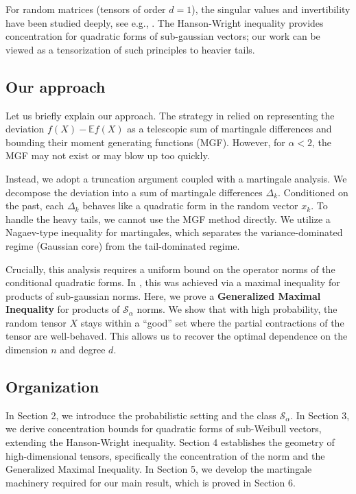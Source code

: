 \documentclass[11pt]{amsart}
\theoremstyle{definition}
\theoremstyle{remark}
\begin{document}
For random matrices (tensors of order $d=1$), the singular values and invertibility have been studied deeply, see e.g., \cite{Rudelson2008, Rudelson2012, RudelsonVershynin2008, RudelsonVershynin2009, TaoVu2009, TaoVu2010, Tikhomirov2015, Tikhomirov2016}. The Hanson-Wright inequality \cite{RudelsonVershynin2013} provides concentration for quadratic forms of sub-gaussian vectors; our work can be viewed as a tensorization of such principles to heavier tails.

\subsection{Our approach}
Let us briefly explain our approach. The strategy in \cite{Vershynin2020} relied on representing the deviation $f(X) - \mathbb{E}f(X)$ as a telescopic sum of martingale differences and bounding their moment generating functions (MGF). However, for $\alpha < 2$, the MGF may not exist or may blow up too quickly.

Instead, we adopt a truncation argument coupled with a martingale analysis. We decompose the deviation into a sum of martingale differences $\Delta_k$. Conditioned on the past, each $\Delta_k$ behaves like a quadratic form in the random vector $x_k$. To handle the heavy tails, we cannot use the MGF method directly. We utilize a Nagaev-type inequality for martingales, which separates the variance-dominated regime (Gaussian core) from the tail-dominated regime.

Crucially, this analysis requires a uniform bound on the operator norms of the conditional quadratic forms. In \cite{Vershynin2020}, this was achieved via a maximal inequality for products of sub-gaussian norms. Here, we prove a \textbf{Generalized Maximal Inequality} for products of $\mathcal{S}_\alpha$ norms. We show that with high probability, the random tensor $X$ stays within a ``good'' set where the partial contractions of the tensor are well-behaved. This allows us to recover the optimal dependence on the dimension $n$ and degree $d$.

\subsection{Organization}
In Section 2, we introduce the probabilistic setting and the class $\mathcal{S}_\alpha$. In Section 3, we derive concentration bounds for quadratic forms of sub-Weibull vectors, extending the Hanson-Wright inequality. Section 4 establishes the geometry of high-dimensional tensors, specifically the concentration of the norm and the Generalized Maximal Inequality. In Section 5, we develop the martingale machinery required for our main result, which is proved in Section 6.
\end{document}
